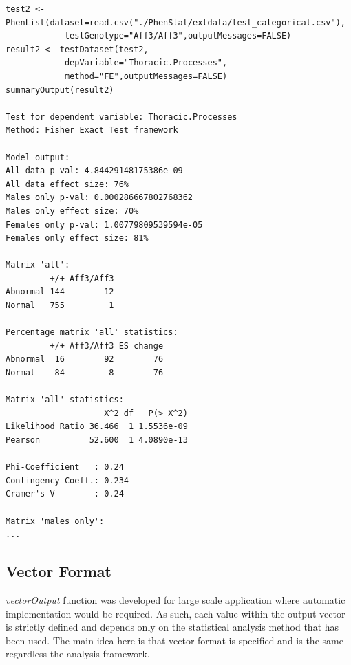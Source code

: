 \documentclass[12pt,a4paper]{article}
\begin{document}
\begingroup
    \fontsize{8pt}{12pt}\selectfont
\begin{verbatim}
test2 <- PhenList(dataset=read.csv("./PhenStat/extdata/test_categorical.csv"),
            testGenotype="Aff3/Aff3",outputMessages=FALSE)
result2 <- testDataset(test2,
            depVariable="Thoracic.Processes",
            method="FE",outputMessages=FALSE)  
summaryOutput(result2)

Test for dependent variable: Thoracic.Processes
Method: Fisher Exact Test framework

Model output:
All data p-val: 4.84429148175386e-09
All data effect size: 76%
Males only p-val: 0.000286667802768362
Males only effect size: 70%
Females only p-val: 1.00779809539594e-05
Females only effect size: 81%

Matrix 'all':
         +/+ Aff3/Aff3
Abnormal 144        12
Normal   755         1

Percentage matrix 'all' statistics:
         +/+ Aff3/Aff3 ES change
Abnormal  16        92        76
Normal    84         8        76

Matrix 'all' statistics:
                    X^2 df   P(> X^2)
Likelihood Ratio 36.466  1 1.5536e-09
Pearson          52.600  1 4.0890e-13

Phi-Coefficient   : 0.24 
Contingency Coeff.: 0.234 
Cramer's V        : 0.24 

Matrix 'males only':
...
\end{verbatim}
\endgroup

\subsection{Vector Format}
\textit{vectorOutput} function was developed for large scale application where automatic implementation would be required. 
As such, each value within the output vector is strictly defined and depends only on the statistical analysis method that has been used. 
The main idea here is that vector format is specified and is the same regardless the analysis framework.
\end{document}
